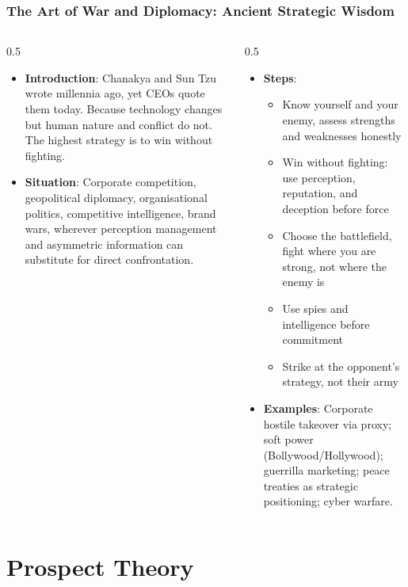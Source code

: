 \begin{frame}[fragile]\frametitle{The Art of War and Diplomacy: Ancient Strategic Wisdom}
\begin{columns}
    \begin{column}[T]{0.5\linewidth}
      \begin{itemize}
        \item \textbf{Introduction}: Chanakya and Sun Tzu wrote millennia ago, yet CEOs quote them today. Because technology changes but human nature and conflict do not. The highest strategy is to win without fighting.
        \item \textbf{Situation}: Corporate competition, geopolitical diplomacy, organisational politics, competitive intelligence, brand wars, wherever perception management and asymmetric information can substitute for direct confrontation.
      \end{itemize}
    \end{column}
    \begin{column}[T]{0.5\linewidth}
      \begin{itemize}
        \item \textbf{Steps}:
        \begin{itemize}
          \item Know yourself and your enemy, assess strengths and weaknesses honestly
          \item Win without fighting: use perception, reputation, and deception before force
          \item Choose the battlefield, fight where you are strong, not where the enemy is
          \item Use spies and intelligence before commitment
          \item Strike at the opponent's strategy, not their army
        \end{itemize}\item \textbf{Examples}: Corporate hostile takeover via proxy; soft power (Bollywood/Hollywood); guerrilla marketing; peace treaties as strategic positioning; cyber warfare.
      \end{itemize}
    \end{column}
  \end{columns}
\end{frame}

\section{Prospect Theory}

